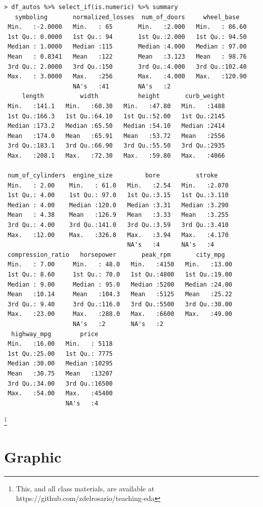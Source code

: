 \documentclass{article}
\newcommand\blfootnote[1]{%
  \begingroup
  \renewcommand\thefootnote{}\footnote{#1}%
  \addtocounter{footnote}{-1}%
  \endgroup
}
\begin{document}
\begin{lstlisting}
> df_autos %>% select_if(is.numeric) %>% summary
   symboling       normalized_losses  num_of_doors     wheel_base
 Min.   :-2.0000   Min.   : 65       Min.   :2.000   Min.   : 86.60
 1st Qu.: 0.0000   1st Qu.: 94       1st Qu.:2.000   1st Qu.: 94.50
 Median : 1.0000   Median :115       Median :4.000   Median : 97.00
 Mean   : 0.8341   Mean   :122       Mean   :3.123   Mean   : 98.76
 3rd Qu.: 2.0000   3rd Qu.:150       3rd Qu.:4.000   3rd Qu.:102.40
 Max.   : 3.0000   Max.   :256       Max.   :4.000   Max.   :120.90
                   NA's   :41        NA's   :2
     length          width           height       curb_weight
 Min.   :141.1   Min.   :60.30   Min.   :47.80   Min.   :1488
 1st Qu.:166.3   1st Qu.:64.10   1st Qu.:52.00   1st Qu.:2145
 Median :173.2   Median :65.50   Median :54.10   Median :2414
 Mean   :174.0   Mean   :65.91   Mean   :53.72   Mean   :2556
 3rd Qu.:183.1   3rd Qu.:66.90   3rd Qu.:55.50   3rd Qu.:2935
 Max.   :208.1   Max.   :72.30   Max.   :59.80   Max.   :4066

 num_of_cylinders  engine_size         bore          stroke
 Min.   : 2.00    Min.   : 61.0   Min.   :2.54   Min.   :2.070
 1st Qu.: 4.00    1st Qu.: 97.0   1st Qu.:3.15   1st Qu.:3.110
 Median : 4.00    Median :120.0   Median :3.31   Median :3.290
 Mean   : 4.38    Mean   :126.9   Mean   :3.33   Mean   :3.255
 3rd Qu.: 4.00    3rd Qu.:141.0   3rd Qu.:3.59   3rd Qu.:3.410
 Max.   :12.00    Max.   :326.0   Max.   :3.94   Max.   :4.170
                                  NA's   :4      NA's   :4
 compression_ratio   horsepower       peak_rpm       city_mpg
 Min.   : 7.00     Min.   : 48.0   Min.   :4150   Min.   :13.00
 1st Qu.: 8.60     1st Qu.: 70.0   1st Qu.:4800   1st Qu.:19.00
 Median : 9.00     Median : 95.0   Median :5200   Median :24.00
 Mean   :10.14     Mean   :104.3   Mean   :5125   Mean   :25.22
 3rd Qu.: 9.40     3rd Qu.:116.0   3rd Qu.:5500   3rd Qu.:30.00
 Max.   :23.00     Max.   :288.0   Max.   :6600   Max.   :49.00
                   NA's   :2       NA's   :2
  highway_mpg        price
 Min.   :16.00   Min.   : 5118
 1st Qu.:25.00   1st Qu.: 7775
 Median :30.00   Median :10295
 Mean   :30.75   Mean   :13207
 3rd Qu.:34.00   3rd Qu.:16500
 Max.   :54.00   Max.   :45400
                 NA's   :4
\end{lstlisting}

\newpage
\blfootnote{This, and all class materials, are available at
  https://github.com/zdelrosario/teaching-eda}
\section{Graphic}
\end{document}
